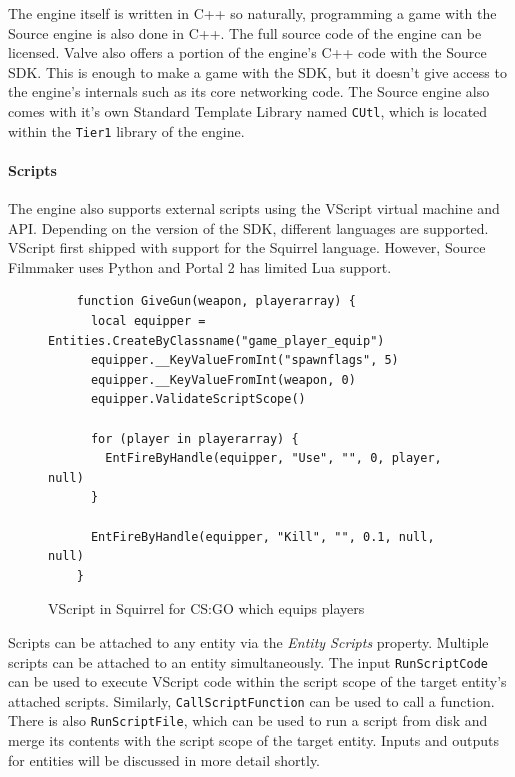 \documentclass[a4paper, 12pt]{scrartcl}
\begin{document}
The engine itself is written in C++ so naturally, programming a game with the Source engine is also done in C++. The full source code of the engine can be licensed. Valve also offers a portion of the engine's C++ code with the Source SDK. This is enough to make a game with the SDK, but it doesn't give access to the engine's internals such as its core networking code. The Source engine also comes with it's own Standard Template Library named \texttt{CUtl}, which is located within the \texttt{Tier1} library of the engine.

\paragraph{Scripts}
The engine also supports external scripts using the VScript virtual machine and API. Depending on the version of the SDK, different languages are supported. VScript first shipped with support for the Squirrel language. However, Source Filmmaker uses Python and Portal 2 has limited Lua support.

\begin{figure}[!ht]
  \begin{verbatim}
    function GiveGun(weapon, playerarray) {
      local equipper = Entities.CreateByClassname("game_player_equip")
      equipper.__KeyValueFromInt("spawnflags", 5)
      equipper.__KeyValueFromInt(weapon, 0)
      equipper.ValidateScriptScope()

      for (player in playerarray) {
        EntFireByHandle(equipper, "Use", "", 0, player, null)
      }

      EntFireByHandle(equipper, "Kill", "", 0.1, null, null)
    }
  \end{verbatim}
  \caption{VScript in Squirrel for CS:GO which equips players}
  \label{fig:source_vscript}
\end{figure}

Scripts can be attached to any entity via the \textit{Entity Scripts} property. Multiple scripts can be attached to an entity simultaneously. The input \texttt{RunScriptCode} can be used to execute VScript code within the script scope of the target entity's attached scripts. Similarly, \texttt{CallScriptFunction} can be used to call a function. There is also \texttt{RunScriptFile}, which can be used to run a script from disk and merge its contents with the script scope of the target entity. Inputs and outputs for entities will be discussed in more detail shortly.
\end{document}
